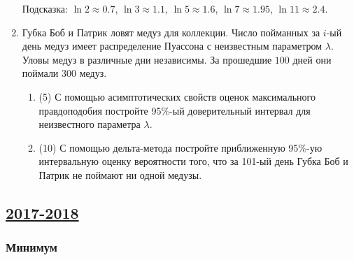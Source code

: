 \begin{enumerate}
Подсказка: $\ln 2 \approx 0.7$, $\ln 3 \approx 1.1$, $\ln 5 \approx 1.6$, $\ln 7 \approx 1.95$, $\ln 11 \approx 2.4$.


\item Губка Боб и Патрик ловят медуз для коллекции. Число пойманных за $i$-ый день медуз имеет распределение Пуассона с неизвестным параметром $\lambda$. Уловы медуз в различные дни независимы. За прошедшие $100$ дней они поймали $300$ медуз. 

\begin{enumerate}
    \item (5) С помощью асимптотических свойств оценок максимального правдоподобия постройте 95\%-ый доверительный интервал для неизвестного параметра $\lambda$.
    \item (10) С помощью дельта-метода постройте приближенную 95\%-ую интервальную оценку вероятности того, что за 101-ый день Губка Боб и Патрик не поймают ни одной медузы.
\end{enumerate}

\end{enumerate}





\subsection[2017-2018]{\hyperref[sec:sol_kr_04_2017_2018]{2017-2018}}
\label{sec:kr_04_2017_2018}


\subsubsection*{Минимум}

